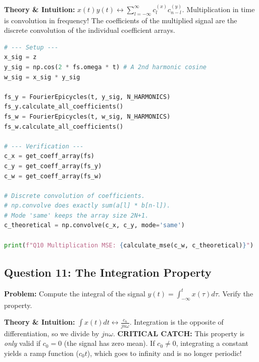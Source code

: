 \documentclass[11pt]{article}
\begin{document}
\textbf{Theory \& Intuition:} 
$x(t)y(t) \leftrightarrow \sum_{l=-\infty}^{\infty} c_l^{(x)} c_{n-l}^{(y)}$. 
Multiplication in time is convolution in frequency! The coefficients of the multiplied signal are the discrete convolution of the individual coefficient arrays.

\begin{lstlisting}[language=Python]
# --- Setup ---
x_sig = z
y_sig = np.cos(2 * fs.omega * t) # A 2nd harmonic cosine
w_sig = x_sig * y_sig

fs_y = FourierEpicycles(t, y_sig, N_HARMONICS)
fs_y.calculate_all_coefficients()
fs_w = FourierEpicycles(t, w_sig, N_HARMONICS)
fs_w.calculate_all_coefficients()

# --- Verification ---
c_x = get_coeff_array(fs)
c_y = get_coeff_array(fs_y)
c_w = get_coeff_array(fs_w)

# Discrete convolution of coefficients. 
# np.convolve does exactly sum(a[l] * b[n-l]). 
# Mode 'same' keeps the array size 2N+1.
c_theoretical = np.convolve(c_x, c_y, mode='same')

print(f"Q10 Multiplication MSE: {calculate_mse(c_w, c_theoretical)}")
\end{lstlisting}

\subsection{Question 11: The Integration Property}
\textbf{Problem:} Compute the integral of the signal $y(t) = \int_{-\infty}^t x(\tau) d\tau$. Verify the property.

\textbf{Theory \& Intuition:} 
$\int x(t) dt \leftrightarrow \frac{c_n}{jn\omega}$. 
Integration is the opposite of differentiation, so we divide by $jn\omega$. \textbf{CRITICAL CATCH:} This property is \textit{only} valid if $c_0 = 0$ (the signal has zero mean). If $c_0 \neq 0$, integrating a constant yields a ramp function ($c_0 t$), which goes to infinity and is no longer periodic!
\end{document}
